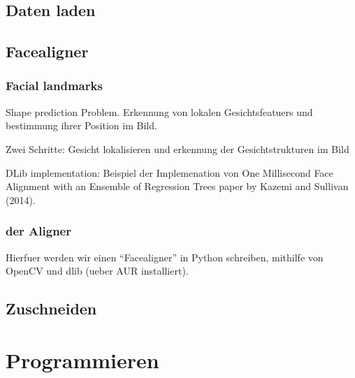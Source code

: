 \subsection{Daten laden}

\subsection{Facealigner}
\subsubsection{Facial landmarks}
Shape prediction Problem. Erkennung von lokalen Gesichtsfeatuers und bestimmung
ihrer Position im Bild.

Zwei Schritte: Gesicht lokalisieren und erkennung der Gesichtstrukturen im Bild

DLib implementation:
Beispiel der Implemenation von One Millisecond Face Alignment with an Ensemble of Regression Trees paper by Kazemi and Sullivan (2014).

\cite{net:facial_landmarks}

\subsubsection{der Aligner}

 Hierfuer werden wir einen
``Facealigner'' in Python schreiben, mithilfe von OpenCV und dlib (ueber AUR installiert).

\cite{net:face_alignment}

\subsection{Zuschneiden}


\section{Programmieren}

